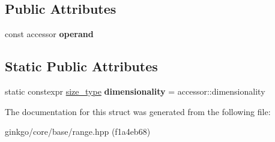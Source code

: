 \subsection*{Public Attributes}
\begin{DoxyCompactItemize}
\item 
\mbox{\label{structgko_1_1accessor_1_1transpose__operation_a2b4c2d5172d31e787f8d4965251743b3}} 
const accessor {\bfseries operand}
\end{DoxyCompactItemize}
\subsection*{Static Public Attributes}
\begin{DoxyCompactItemize}
\item 
\mbox{\label{structgko_1_1accessor_1_1transpose__operation_aee04484bec2b33a04e2482077a5925a5}} 
static constexpr \hyperlink{namespacegko_a6e5c95df0ae4e47aab2f604a22d98ee7}{size\+\_\+type} {\bfseries dimensionality} = accessor\+::dimensionality
\end{DoxyCompactItemize}


The documentation for this struct was generated from the following file\+:\begin{DoxyCompactItemize}
\item 
ginkgo/core/base/range.\+hpp (f1a4eb68)\end{DoxyCompactItemize}
